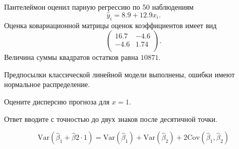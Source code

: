 
\begin{question}
Пантелеймон оценил парную регрессию по 50 наблюдениям
\[
\hat y_i = 8.9 + 12.9 x_i.
\]
Оценка ковариационной матрицы оценок коэффициентов имеет вид
\[
\begin{pmatrix}
16.7 & -4.6 \\
-4.6 & 1.74 \\
\end{pmatrix}.
\]
Величина суммы квадратов остатков равна \(10871\).

Предпосылки классической линейной модели выполнены, ошибки имеют нормальное распределение.

Оцените дисперсию прогноза для \(x=1\).

Ответ вводите с точностью до двух знаков после десятичной точки.
\end{question}

\begin{solution}
\[
\mathrm{Var}(\hat\beta_1 + \hat\beta2 \cdot 1) =\mathrm{Var}(\hat\beta_1) + \mathrm{Var}(\hat\beta_2) +2\mathrm{Cov}(\hat\beta_1, \hat\beta_2)
\]
\end{solution}

